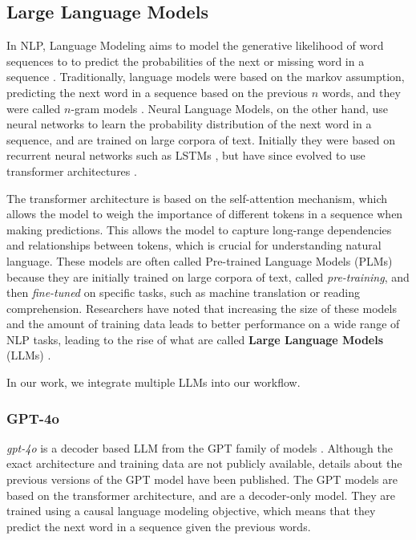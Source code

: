 
\subsection{Large Language Models}
In NLP, Language Modeling aims to model the generative likelihood of word sequences to to predict the probabilities of the next or missing word
in a sequence \cite{zhaoSurveyLargeLanguage2025}. Traditionally, language models were based on the markov assumption, predicting the next word 
in a sequence based on the previous $n$ words, and they were called $n$-gram models \cite{jm3}. Neural Language Models, on the other hand, use neural networks
to learn the probability distribution of the next word in a sequence, and are trained on large corpora of text. Initially they were based on recurrent neural networks
such as LSTMs \cite{hochreiterLongShortTermMemory1997}, but have since evolved to use transformer architectures \cite{vaswaniAttentionAllYou2023}.

The transformer architecture is based on the self-attention mechanism, which allows the model to weigh the importance of different tokens in a sequence
when making predictions. This allows the model to capture long-range dependencies and relationships between tokens, which is crucial for 
understanding natural language. These models are often called Pre-trained Language Models (PLMs) because they are initially trained on large corpora of text,
called \textit{pre-training}, and then \textit{fine-tuned} on specific tasks, such as machine translation or reading comprehension. Researchers 
have noted that increasing the size of these models and the amount of training data leads to better performance on a wide range of NLP tasks, leading to the
rise of what are called \textbf{Large Language Models} (LLMs) \cite{brownLanguageModelsAre2020}.

In our work, we integrate multiple LLMs into our workflow.
\subsubsection{GPT-4o}
 \textit{gpt-4o} is a decoder based LLM from the GPT family of models \cite{brownLanguageModelsAre2020}. Although the exact architecture and training data are not publicly available, 
 details about the previous versions of the GPT model have been published. The GPT models are based on the transformer architecture, and are a decoder-only model. 
 They are trained using a causal language modeling objective, which means that they predict the next word in a sequence given the previous words.

